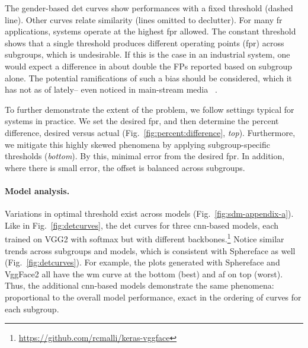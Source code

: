 
The gender-based \gls{det} curves show performances with a fixed threshold (dashed line). Other curves relate similarity (lines omitted to declutter). For many \gls{fr} applications, systems operate at the highest \gls{fpr} allowed. The constant threshold shows that a single threshold produces different operating points (\ie \gls{fpr}) across subgroups, which is undesirable. %
If this is the case in an industrial system, one would expect a difference in about double the FPs reported based on subgroup alone. The potential ramifications of such a bias should be considered, which it has not as of lately-- even noticed in main-stream media ~\cite{england2019,snow2018}.

To further demonstrate the extent of the problem, we follow settings typical for systems in practice. We set the desired \gls{fpr}, and then determine the percent difference, \ie desired versus actual (Fig.~\ref{fig:percent:difference}, \emph{top}). Furthermore, we mitigate this highly skewed phenomena by applying subgroup-specific thresholds (\emph{bottom}). By this, minimal error from the desired \gls{fpr}. In addition, where there is small error, the offset is balanced across subgroups.

\noindent\paragraph{Model analysis.}
Variations in optimal threshold exist across models (Fig.~\ref{fig:sdm-appendix-a}). Like in Fig.~\ref{fig:detcurves}, the \gls{det} curves for three \gls{cnn}-based models, each trained on VGG2 with softmax but with different backbones.\footnote{\href{https://github.com/rcmalli/keras-vggface}{https://github.com/rcmalli/keras-vggface}} Notice similar trends across subgroups and models, which is consistent with  Sphereface as well (Fig.~\ref{fig:detcurves}). For example, the plots generated with Sphereface and VggFace2 all have the \gls{wm} curve at the bottom (\ie best) and \gls{af} on top (\ie worst). Thus, the additional \gls{cnn}-based models demonstrate the same phenomena: proportional to the overall model performance, exact in the ordering of curves for each subgroup.

